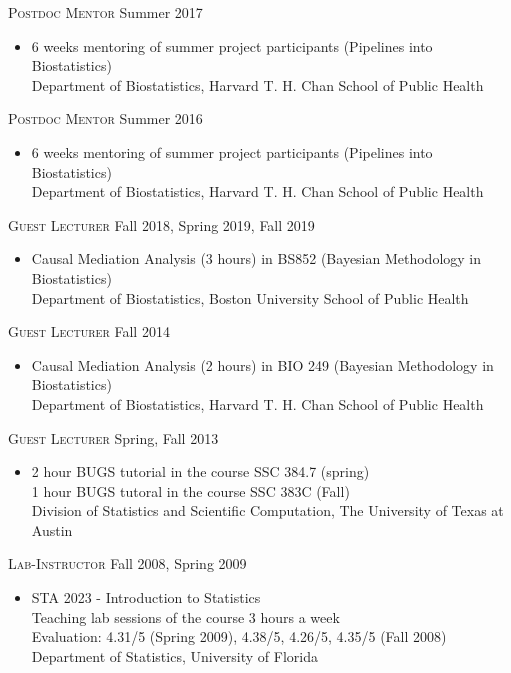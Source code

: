 \documentclass[10pt]{article}
\newenvironment{innerlist}[1][\enskip\textbullet]%
        {\begin{itemize}[#1,leftmargin=*,parsep=0pt,itemsep=0pt,topsep=0pt,partopsep=0pt]}
        {\end{itemize}}
\begin{document}
\textsc{Postdoc Mentor} \hfill {Summer 2017}
\begin{innerlist}
\item[] 6 weeks mentoring of summer project participants (Pipelines into Biostatistics)\\
Department of Biostatistics,  Harvard T. H. Chan School of Public Health\\
\end{innerlist}


\textsc{Postdoc Mentor} \hfill {Summer 2016}
\begin{innerlist}
\item[] 6 weeks mentoring of summer project participants (Pipelines into Biostatistics)\\
Department of Biostatistics,  Harvard T. H. Chan School of Public Health\\
\end{innerlist}

\textsc{Guest Lecturer} \hfill {Fall 2018, Spring 2019, Fall 2019}
\begin{innerlist}
\item[] Causal Mediation Analysis (3 hours) in BS852
  (Bayesian Methodology in Biostatistics)\\
        Department of Biostatistics, Boston University School of Public Health\\
\end{innerlist}


\textsc{Guest Lecturer} \hfill {Fall 2014}
\begin{innerlist}
\item[] Causal Mediation Analysis (2 hours) in BIO 249
  (Bayesian Methodology in Biostatistics)\\
        Department of Biostatistics, Harvard T. H. Chan School of Public Health\\
\end{innerlist}


\textsc{Guest Lecturer} \hfill {Spring, Fall 2013}
\begin{innerlist}
\item[]  2 hour BUGS tutorial in the course SSC 384.7 (spring)\\
	1 hour BUGS tutoral in the course SSC 383C (Fall)\\
        Division of Statistics and Scientific Computation, The University of Texas at Austin\\
\end{innerlist}

\textsc{Lab-Instructor} \hfill {Fall 2008, Spring 2009}
\begin{innerlist}
\item[] STA 2023 - Introduction to Statistics\\
        Teaching lab sessions of the course 3 hours a week\\
	Evaluation: 4.31/5 (Spring 2009), 4.38/5, 4.26/5, 4.35/5 (Fall 2008)\\
        Department of Statistics, University of Florida\\
\end{innerlist}
\end{document}
